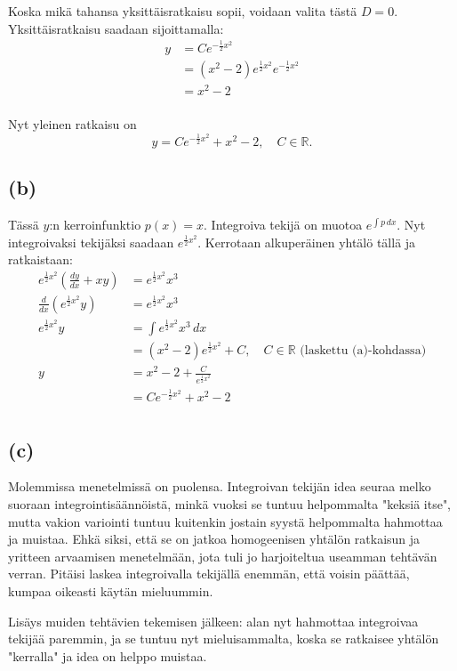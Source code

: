 \documentclass{article}
\begin{document}
Koska mikä tahansa yksittäisratkaisu sopii, voidaan valita tästä $D = 0$.
Yksittäisratkaisu saadaan sijoittamalla:
\begin{align*}
  y &= Ce^{-\frac{1}{2}x^2} \\
    &= (x^2 - 2)e^{\frac{1}{2}x^2}e^{-\frac{1}{2}x^2} \\
    &= x^2 - 2 \\
\end{align*}

Nyt yleinen ratkaisu on
\[
  y = Ce^{-\frac{1}{2}x^2} + x^2 - 2, \quad C \in \mathbb{R}.
\]

\subsection*{(b)}

Tässä $y$:n kerroinfunktio $p(x) = x$.
Integroiva tekijä on muotoa $e^{\int p\,dx}$.
Nyt integroivaksi tekijäksi saadaan $e^{\frac{1}{2}x^2}$.
Kerrotaan alkuperäinen yhtälö tällä ja ratkaistaan:
\begin{align*}
  e^{\frac{1}{2}x^2}(\frac{dy}{dx} + xy) &= e^{\frac{1}{2}x^2}x^3 \\
  \frac{d}{dx}(e^{\frac{1}{2}x^2}y) &= e^{\frac{1}{2}x^2}x^3 \\
  e^{\frac{1}{2}x^2}y &= \int e^{\frac{1}{2}x^2}x^3 \,dx \\
                      &= (x^2 - 2)e^{\frac{1}{2}x^2} + C, \quad C \in \mathbb{R} \text{ (laskettu (a)-kohdassa)} \\
  y &= x^2 - 2 + \frac{C}{e^{\frac{1}{2}x^2}} \\
    &= Ce^{-\frac{1}{2}x^2} + x^2 - 2 \\
\end{align*}

\subsection*{(c)}

Molemmissa menetelmissä on puolensa. Integroivan tekijän idea seuraa melko
suoraan integrointisäännöistä, minkä vuoksi se tuntuu helpommalta "keksiä
itse", mutta vakion variointi tuntuu kuitenkin jostain syystä helpommalta
hahmottaa ja muistaa. Ehkä siksi, että se on jatkoa homogeenisen yhtälön
ratkaisun ja yritteen arvaamisen menetelmään, jota tuli jo harjoiteltua
useamman tehtävän verran. Pitäisi laskea integroivalla tekijällä enemmän,
että voisin päättää, kumpaa oikeasti käytän mieluummin.

Lisäys muiden tehtävien tekemisen jälkeen: alan nyt hahmottaa integroivaa
tekijää paremmin, ja se tuntuu nyt mieluisammalta, koska se ratkaisee yhtälön
"kerralla" ja idea on helppo muistaa.
\end{document}
